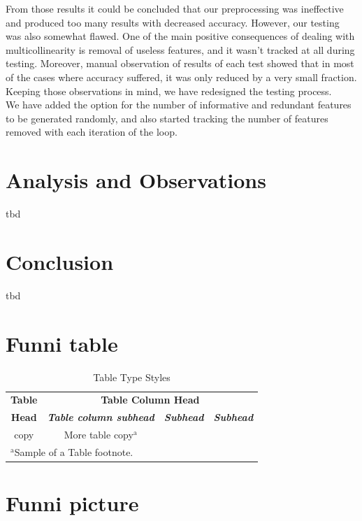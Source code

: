 \documentclass[conference]{IEEEtran}
\begin{document}
From those results it could be concluded that our preprocessing was ineffective and produced too many results with decreased accuracy. However, our testing was also somewhat flawed. One of the main positive consequences of dealing with multicollinearity is removal of useless features, and it wasn't tracked at all during testing. Moreover, manual observation of results of each test showed that in most of the cases where accuracy suffered, it was only reduced by a very small fraction. Keeping those observations in mind, we have redesigned the testing process.\\

We have added the option for the number of informative and redundant features to be generated randomly, and also started tracking the number of features removed with each iteration of the loop. 

\section{Analysis and Observations}
tbd

\section{Conclusion}
tbd




\section{Funni table}

\begin{table}[htbp]
\caption{Table Type Styles}
\begin{center}
\begin{tabular}{|c|c|c|c|}
\hline
\textbf{Table}&\multicolumn{3}{|c|}{\textbf{Table Column Head}} \\
\cline{2-4} 
\textbf{Head} & \textbf{\textit{Table column subhead}}& \textbf{\textit{Subhead}}& \textbf{\textit{Subhead}} \\
\hline
copy& More table copy$^{\mathrm{a}}$& &  \\
\hline
\multicolumn{4}{l}{$^{\mathrm{a}}$Sample of a Table footnote.}
\end{tabular}
\label{tab1}
\end{center}
\end{table}

\section{Funni picture}
\end{document}
